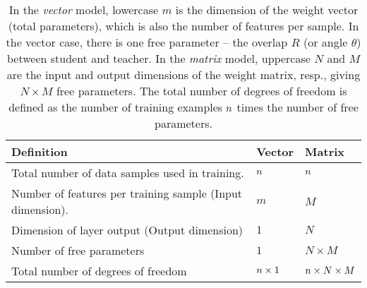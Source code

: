 \begin{table}[H]
\centering
\begin{tabular}{l|l|l}
\toprule
 \textbf{Definition} & \textbf{Vector} & \textbf{Matrix} \\
\midrule
 Total number of data samples used in training. & $n$ & $n$ \\
 Number of features per training sample (Input dimension). & $m$ & $M$ \\
 Dimension of layer output (Output dimension)  & $1$ & $N$ \\
 Number of free parameters & $1$ & $N\times M$ \\
 Total number of degrees of freedom & $n\times 1$ & $n\times N\times M$ \\
\bottomrule
\end{tabular}
\caption{In the \emph{vector} model, lowercase $m$ is the dimension of the weight vector (total parameters), which is also the number of features per sample. In the vector case, there is one free parameter -- the overlap $R$ (or angle $\theta$) between student and teacher. In the \emph{matrix} model, uppercase $N$ and $M$ are the input and output dimensions of the weight matrix, resp., giving $N\times M$ free parameters.
The total number of degrees of freedom is defined as the number of training examples $n$ times the number of free parameters.}
\label{tab:dim_notation}
\end{table}

